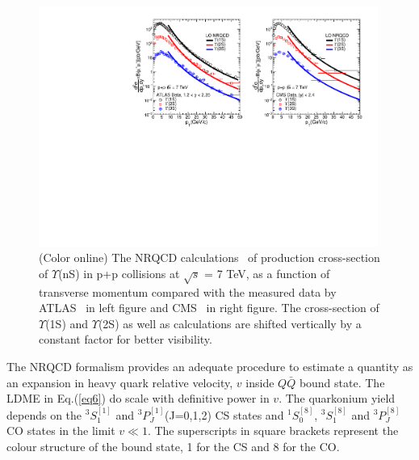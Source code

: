 \begin{figure}
  \centering
  \includegraphics[width=0.99\textwidth]{Figures/Fig4_CMS_ATLAS_YnS_7TeV_Pt.pdf}
  \caption{\small{(Color online) The NRQCD calculations~\cite{Kumar:2021sek} of production cross-section of $\Upsilon$(nS) in
      p+p collisions at $\sqrt{s}$ = 7 TeV, as a function of transverse momentum compared with
      the measured data by ATLAS~\cite{Aad:2012dlq} in left figure and CMS~\cite{Chatrchyan:2013yna}
      in right figure. The cross-section of $\Upsilon$(1S) and $\Upsilon$(2S) as well as
      calculations are shifted vertically by a constant factor for better visibility.}}
  \label{Fig:SigmaYnSCMS7TeV}
\end{figure}



The NRQCD formalism provides an adequate procedure to estimate a quantity as an expansion in 
heavy quark relative velocity, $v$ inside $Q\bar{Q}$ bound state. The LDME in Eq.(\ref{eq6})
do scale with definitive power in $v$. The quarkonium yield depends on the $^3S_1^{[1]}$ 
and $^3P_J^{[1]}$(J=0,1,2) CS states and $^1S_0^{[8]}$, $^3S_1^{[8]}$ and $^3P_J^{[8]}$
CO states in the limit $v\ll 1$.
The superscripts in square brackets represent the colour structure of the bound state,
1 for the CS and 8 for the CO.





